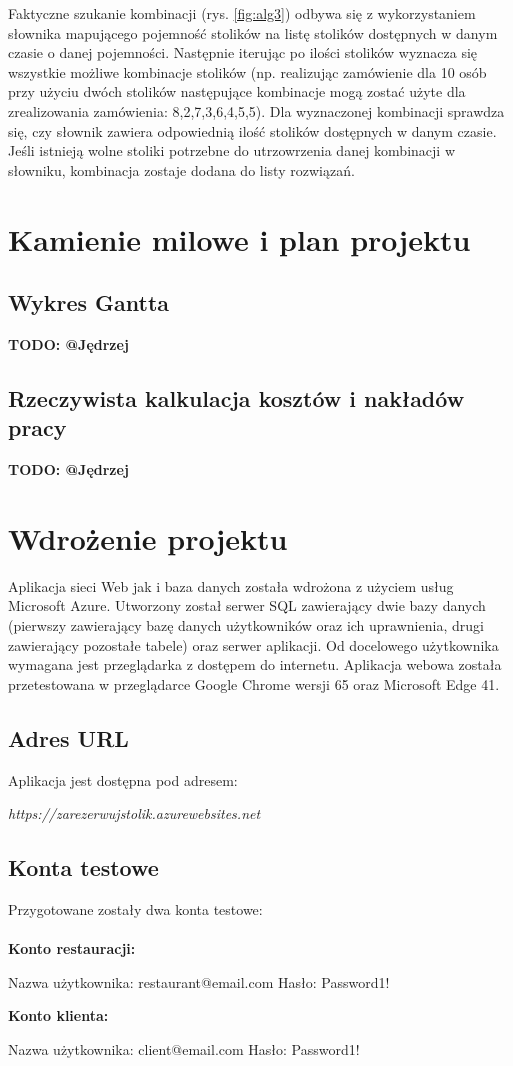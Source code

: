 \documentclass{article}
\begin{document}
Faktyczne szukanie kombinacji (rys. \ref{fig:alg3}) odbywa się z wykorzystaniem słownika mapującego pojemność stolików na listę stolików dostępnych w danym czasie o danej pojemności. Następnie iterując po ilości stolików wyznacza się wszystkie możliwe kombinacje stolików (np. realizując zamówienie dla 10 osób przy użyciu dwóch stolików następujące kombinacje mogą zostać użyte dla zrealizowania zamówienia: {{8,2},{7,3},{6,4},{5,5}}). Dla wyznaczonej kombinacji sprawdza się, czy słownik zawiera odpowiednią ilość stolików dostępnych w danym czasie. Jeśli istnieją wolne stoliki potrzebne do utrzowrzenia danej kombinacji w słowniku, kombinacja zostaje dodana do listy rozwiązań.

\section{Kamienie milowe i plan projektu}
\subsection{Wykres Gantta}

{\color{red}\textbf{TODO: @Jędrzej}}
\subsection{Rzeczywista kalkulacja kosztów i nakładów pracy}
{\color{red}\textbf{TODO: @Jędrzej}}


\section{Wdrożenie projektu}
Aplikacja sieci Web jak i baza danych została wdrożona z użyciem usług Microsoft Azure. Utworzony został serwer SQL zawierający dwie bazy danych (pierwszy zawierający bazę danych użytkowników oraz ich uprawnienia, drugi zawierający pozostałe tabele) oraz serwer aplikacji. Od docelowego użytkownika wymagana jest przeglądarka z dostępem do internetu. Aplikacja webowa została przetestowana w przeglądarce Google Chrome wersji 65 oraz Microsoft Edge 41.
\subsection{Adres URL}
Aplikacja jest dostępna pod adresem:
\begin{center}
\textit{https://zarezerwujstolik.azurewebsites.net}
\end{center}
\subsection{Konta testowe}
Przygotowane zostały dwa konta testowe:\\\\
\textbf{Konto restauracji:}
\begin{center}
Nazwa użytkownika: restaurant@email.com Hasło: Password1!
\end{center}
\textbf{Konto klienta:}
\begin{center}
Nazwa użytkownika: client@email.com Hasło: Password1!
\end{center}
\end{document}
